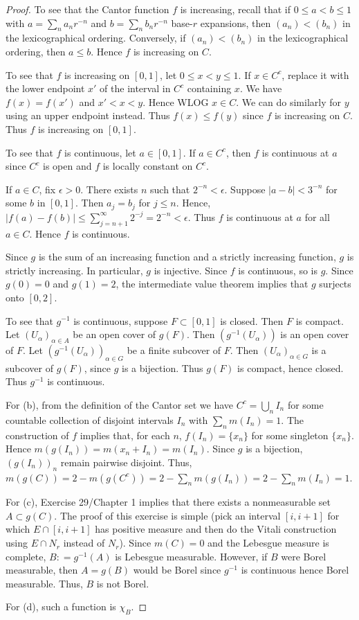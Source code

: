 \documentclass{article}
\begin{document}
\begin{proof}
To see that the Cantor function $f$ is increasing, recall that if $0 \le a < b \le 1$ with $a = \sum_n a_n r^{-n}$ and $b = \sum_n b_n r^{-n}$ base-$r$ expansions, then $(a_n) < (b_n)$ in the lexicographical ordering.   Conversely, if $(a_n) < (b_n)$ in the lexicographical ordering, then $a \le b$.  Hence $f$ is increasing on $C$.  

To see that $f$ is increasing on $[0,1]$, let $0 \le x < y \le 1$.  If $x \in C^c$, replace it with the lower endpoint $x'$ of the interval in $C^c$ containing $x$. We have $f(x) = f(x')$ and $x' < x < y$. Hence WLOG $x \in C$.  We can do similarly for $y$ using an upper endpoint instead. Thus $f(x) \le f(y)$ since $f$ is increasing on $C$.  Thus $f$ is increasing on $[0,1]$.

To see that $f$ is continuous, let $a \in [0,1]$.  If $a \in C^c$, then $f$ is continuous at $a$ since $C^c$ is open and $f$ is locally constant on $C^c$.  

If $a \in C$, fix $\epsilon > 0$.  There exists $n$ such that $2^{-n} < \epsilon$.  Suppose $|a - b| < 3^{-n}$ for some $b$ in $[0,1]$. Then $a_j = b_j$ for $j \le n$.  Hence, $|f(a) - f(b)| \le \sum_{j=n+1}^\infty 2^{-j} = 2^{-n} < \epsilon$.  Thus $f$ is continuous at $a$ for all $a \in C$.  Hence $f$ is continuous.

Since $g$ is the sum of an increasing function and a strictly increasing function, $g$ is strictly increasing.  In particular, $g$ is injective.  Since $f$ is continuous, so is $g$.  Since $g(0) = 0$ and $g(1) = 2$, the intermediate value theorem implies that $g$ surjects onto $[0, 2]$.  

To see that $g^{-1}$ is continuous, suppose $F \subset [0,1]$ is closed.  Then $F$ is compact.  Let $(U_\alpha)_{\alpha \in A}$ be an open cover of $g(F)$. Then $(g^{-1}(U_\alpha))$ is an open cover of $F$. Let $(g^{-1}(U_\alpha))_{\alpha \in G}$ be a finite subcover of $F$.  Then $(U_\alpha)_{\alpha \in G}$ is a subcover of $g(F)$, since $g$ is a bijection.  Thus $g(F)$ is compact, hence closed.  Thus $g^{-1}$ is continuous.

For (b), from the definition of the Cantor set we have $C^c = \bigcup_n I_n$ for some countable collection of disjoint intervals $I_n$ with $\sum_n m(I_n) = 1$.  The construction of $f$ implies that, for each $n$,  $f(I_n) = \{x_n\}$ for some singleton $\{x_n\}$.  Hence $m(g(I_n)) = m(x_n + I_n) = m(I_n)$.  Since $g$ is a bijection, $(g(I_n))_n$ remain pairwise disjoint.  Thus, $m(g(C)) = 2 - m(g(C^c)) = 2 - \sum_n m(g(I_n)) = 2 - \sum_n m(I_n) = 1$.

For (c), Exercise 29/Chapter 1 implies that there exists a nonmeasurable set $A \subset g(C)$. The proof of this exercise is simple (pick an interval $[i, i+1]$ for which $E \cap [i,i+1]$ has positive measure and then do the Vitali construction using $E \cap N_r$ instead of $N_r$).  Since $m(C) = 0$ and the Lebesgue measure is complete, $B: = g^{-1}(A)$ is Lebesgue measurable.   However, if $B$ were Borel measurable, then $A = g(B)$ would be Borel since $g^{-1}$ is continuous hence Borel measurable.  Thus, $B$ is not Borel.

For (d), such a function is $\chi_B$.
\end{proof}
\end{document}
